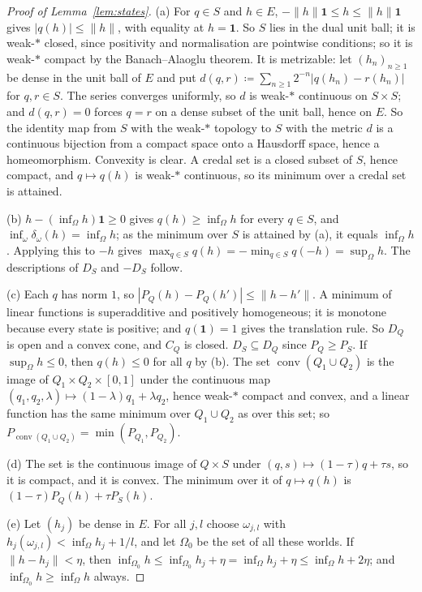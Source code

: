 \documentclass[11pt]{article}
\newcommand{\one}{\mathbf{1}}
\DeclareMathOperator{\conv}{conv}
\theoremstyle{plain}
\theoremstyle{definition}
\theoremstyle{remark}
\begin{document}
\begin{proof}[Proof of Lemma~\ref{lem:states}]
(a) For $q\in S$ and $h\in E$, $-\|h\|\one\le h\le\|h\|\one$ gives $|q(h)|\le\|h\|$, with
equality at $h=\one$. So $S$ lies in the dual unit ball; it is weak-$\ast$ closed, since
positivity and normalisation are pointwise conditions; so it is weak-$\ast$ compact by the
Banach--Alaoglu theorem. It is metrizable: let $(h_n)_{n\ge1}$ be dense in the unit ball of $E$
and put $d(q,r)\coloneqq\sum_{n\ge1}2^{-n}|q(h_n)-r(h_n)|$ for $q,r\in S$. The series converges
uniformly, so $d$ is weak-$\ast$ continuous on $S\times S$; and $d(q,r)=0$ forces $q=r$ on a
dense subset of the unit ball, hence on $E$. So the identity map from $S$ with the weak-$\ast$
topology to $S$ with the metric $d$ is a continuous bijection from a compact space onto a
Hausdorff space, hence a homeomorphism. Convexity is clear. A credal set is a closed subset of
$S$, hence compact, and $q\mapsto q(h)$ is weak-$\ast$ continuous, so its minimum over a credal
set is attained.

(b) $h-(\inf_\Omega h)\one\ge0$ gives $q(h)\ge\inf_\Omega h$ for every $q\in S$, and
$\inf_{\omega}\delta_\omega(h)=\inf_\Omega h$; as the minimum over $S$ is attained by (a), it
equals $\inf_\Omega h$. Applying this to $-h$ gives $\max_{q\in S}q(h)=-\min_{q\in S}q(-h)=
\sup_\Omega h$. The descriptions of $D_S$ and $-D_S$ follow.

(c) Each $q$ has norm $1$, so $|P_Q(h)-P_Q(h')|\le\|h-h'\|$. A minimum of linear functions is
superadditive and positively homogeneous; it is monotone because every state is positive; and
$q(\one)=1$ gives the translation rule. So $D_Q$ is open and a convex cone, and $C_Q$ is closed.
$D_S\subseteq D_Q$ since $P_Q\ge P_S$. If $\sup_\Omega h\le0$, then $q(h)\le0$ for all $q$ by
(b). The set $\conv(Q_1\cup Q_2)$ is the image of $Q_1\times Q_2\times[0,1]$ under the
continuous map $(q_1,q_2,\lambda)\mapsto(1-\lambda)q_1+\lambda q_2$, hence weak-$\ast$ compact
and convex, and a linear function has the same minimum over $Q_1\cup Q_2$ as over this set; so
$P_{\conv(Q_1\cup Q_2)}=\min(P_{Q_1},P_{Q_2})$.

(d) The set is the continuous image of $Q\times S$ under $(q,s)\mapsto(1-\tau)q+\tau s$, so it
is compact, and it is convex. The minimum over it of $q\mapsto q(h)$ is $(1-\tau)P_Q(h)+\tau
P_S(h)$.

(e) Let $(h_j)$ be dense in $E$. For all $j,l$ choose $\omega_{j,l}$ with $h_j(\omega_{j,l})<
\inf_\Omega h_j+1/l$, and let $\Omega_0$ be the set of all these worlds. If $\|h-h_j\|<\eta$,
then $\inf_{\Omega_0}h\le\inf_{\Omega_0}h_j+\eta=\inf_\Omega h_j+\eta\le\inf_\Omega h+2\eta$;
and $\inf_{\Omega_0}h\ge\inf_\Omega h$ always.
\end{proof}
\end{document}
